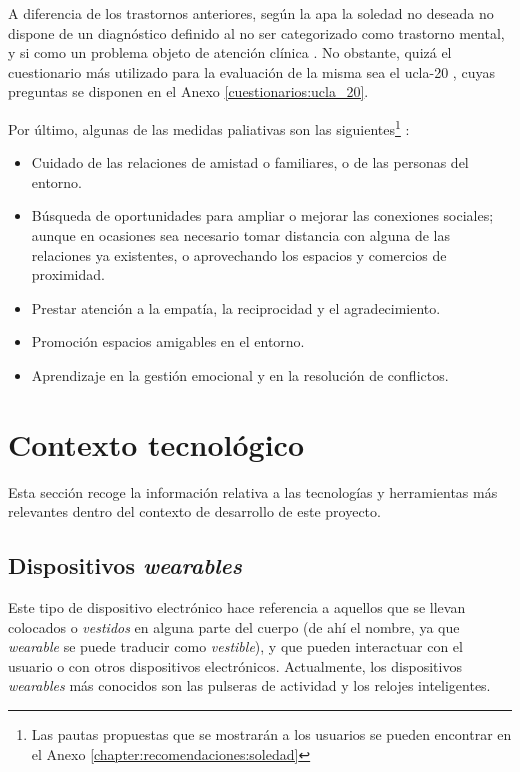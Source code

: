         
        A diferencia de los trastornos anteriores, según la \gls{apa} \cite{american_psychological_association_manual_2014} la soledad no deseada no dispone de un diagnóstico definido al no ser categorizado como trastorno mental, y si como un problema objeto de atención clínica \cite{montejano_martin_soledad_2019}. No obstante, quizá el cuestionario más utilizado para la evaluación de la misma sea el \gls{ucla}-20 \cite{russell_revised_1980}, cuyas preguntas se disponen en el Anexo \ref{cuestionarios:ucla_20}.

        Por último, algunas de las medidas paliativas son las siguientes\footnote{Las pautas propuestas que se mostrarán a los usuarios se pueden encontrar en el Anexo \ref{chapter:recomendaciones:soledad}} \cite{cruz_roja_como_nodate}:

        \begin{itemize}
            \item Cuidado de las relaciones de amistad o familiares, o de las personas del entorno.
            \item Búsqueda de oportunidades para ampliar o mejorar las conexiones sociales; aunque en ocasiones sea necesario tomar distancia con alguna de las relaciones ya existentes, o aprovechando los espacios y comercios de proximidad.
            \item Prestar atención a la empatía, la reciprocidad y el agradecimiento.
            \item Promoción espacios amigables en el entorno.
            \item Aprendizaje en la gestión emocional y en la resolución de conflictos.
        \end{itemize}
        
\section{Contexto tecnológico}

    Esta sección recoge la información relativa a las tecnologías y herramientas más relevantes dentro del contexto de desarrollo de este proyecto.

    \subsection{Dispositivos \textit{wearables}}
        \label{section:contexto:wearables}

        Este tipo de dispositivo electrónico hace referencia a aquellos que se llevan colocados o \textit{vestidos} en alguna parte del cuerpo (de ahí el nombre, ya que \textit{wearable} se puede traducir como \textit{vestible}), y que pueden interactuar con el usuario o con otros dispositivos electrónicos. Actualmente, los dispositivos \textit{wearables} más conocidos son las pulseras de actividad y los relojes inteligentes.

